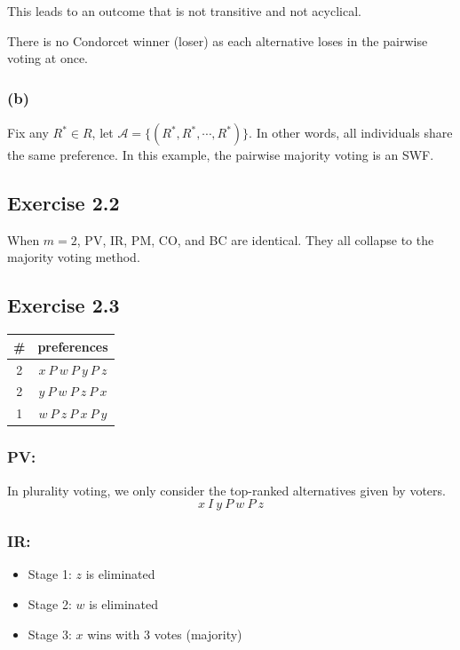 \documentclass[a4paper]{article}
\begin{document}
This leads to an outcome that is not transitive and not acyclical.

There is no Condorcet winner (loser) as each alternative loses in the pairwise voting at once.

\subsubsection*{(b)}

Fix any $R^*\in R$, let $\mathscr{A}=\{(R^*, R^*,\cdots, R^*) \}$. In other words, all individuals share the same preference. In this example, the pairwise majority voting is an SWF.

\subsection*{Exercise 2.2}

When $m=2$, PV, IR, PM, CO, and BC are identical. They all collapse to the majority voting method.

\subsection*{Exercise 2.3}

\begin{table}[!htbp]
    \centering
    \begin{tabular}{c|c|}
        \# & preferences         \\ 
        \hline
        2  & $x\: P\: w\: P\: y\: P\: z$ \\
        2  & $y\: P\: w\: P\: z\: P\: x$ \\
        1  & $w\: P\: z\: P\: x\: P\: y$ \\
        \hline
    \end{tabular}
\end{table}

\subsubsection*{PV:}

In plurality voting, we only consider the top-ranked alternatives given by voters.
\[x\: I\: y\: P\: w\: P\: z  \]

\subsubsection*{IR:}

\begin{itemize}
    \item Stage 1: $z$ is eliminated
    \item Stage 2: $w$ is eliminated
    \item Stage 3: $x$ wins with 3 votes (majority)
\end{itemize}
\end{document}
